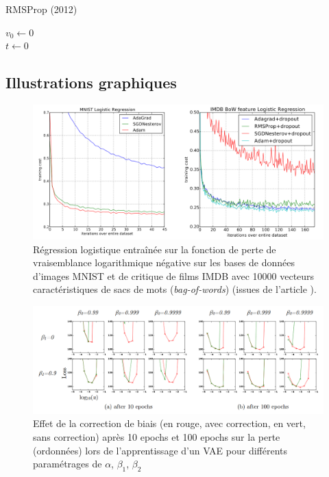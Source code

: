 \documentclass[11pt,a4paper, french]{article}
\theoremstyle{definition}
\begin{document}
\begin{algorithm*}[h!]
  \caption{RMSProp (2012)}
  $v_0\longleftarrow 0$ \\  
  $t\longleftarrow 0$ \\
  \label{rmsprop}
\end{algorithm*}

\subsection{Illustrations graphiques}
\begin{figure}[H]
    \centering
    \includegraphics[width=14cm]{Images/IMDB_MNIST_article.png}
    \caption{Régression logistique entraînée sur la fonction de perte de vraisemblance logarithmique négative sur les bases de données d'images MNIST et de critique de films IMDB avec 10000 vecteurs caractéristiques de sacs de mots (\textit{bag-of-words}) (issues de l'article \cite{kingma2017adammethodstochasticoptimization}).}
    \label{fig:IMDB}
\end{figure}

\begin{figure}[H]
    \centering
    \includegraphics[width=\linewidth]{Images/bias_correction_article.png}
    \caption{Effet de la correction de biais (en rouge, avec correction, en vert, sans correction) après 10 epochs et 100 epochs sur la perte (ordonnées) lors de l'apprentissage d'un VAE pour différents paramétrages de $\alpha$, $\beta_1$, $\beta_2$}
    \label{biais}
\end{figure}
\end{document}

